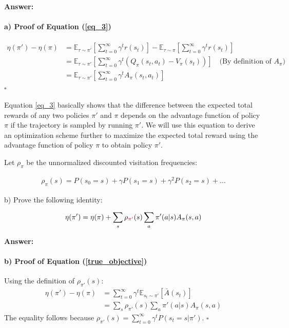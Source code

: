 \textbf{Answer:}

\paragraph{a) Proof of Equation (\ref{eq_3})}
\begin{align*}
\eta(\pi') - \eta(\pi) &= \mathbb{E}_{\tau \sim \pi'}\left[\sum_{t=0}^\infty \gamma^t r(s_t)\right] - \mathbb{E}_{\tau \sim \pi}\left[\sum_{t=0}^\infty \gamma^t r(s_t)\right] \\
&= \mathbb{E}_{\tau \sim \pi'}\left[\sum_{t=0}^\infty \gamma^t (Q_\pi(s_t,a_t) - V_\pi(s_t))\right] \quad \text{(By definition of $A_\pi$)} \\
&= \mathbb{E}_{\tau \sim \pi'}\left[\sum_{t=0}^\infty \gamma^t A_\pi(s_t,a_t)\right]
\end{align*}
$\square$


Equation \ref{eq_3} basically shows that the difference between the expected total rewards of any two policies $\pi'$ and $\pi$ depends on the advantage function of policy $\pi$ if the trajectory is sampled by running $\pi'$. We will use this equation to derive an optimization scheme further to maximize the expected total reward using the advantage function of policy $\pi$ to obtain policy $\pi'$.

Let $\rho_\pi$ be the unnormalized discounted visitation frequencies:

\begin{align*}
    \rho_\pi(s) = P(s_0 = s)+\gamma P(s_1 = s) + \gamma^2 P(s_2 = s) + \ldots
\end{align*}

b) Prove the following identity:

\begin{align}\label{true_objective}
    \eta(\pi') = \eta(\pi) + \sum_{s}\rho_{\textcolor{red}{\pi'}}(s)\sum_{a}\pi'(a|s)A_{\pi}(s, a)
\end{align}


\textbf{Answer:}

\paragraph{b) Proof of Equation (\ref{true_objective})}
Using the definition of $\rho_{\pi'}(s)$:
\begin{align*}
\eta(\pi') - \eta(\pi) &= \sum_{t=0}^\infty \gamma^t \mathbb{E}_{s_t \sim \pi'}[\bar{A}(s_t)] \\
&= \sum_{s} \rho_{\pi'}(s) \sum_{a} \pi'(a|s) A_\pi(s,a)
\end{align*}
The equality follows because $\rho_{\pi'}(s) = \sum_{t=0}^\infty \gamma^t P(s_t = s|\pi')$. $\square$


